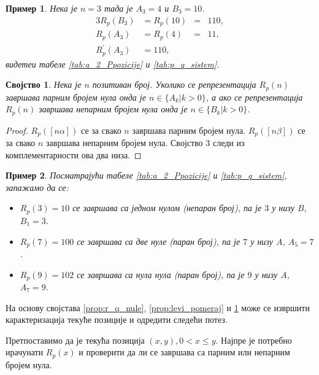 \documentclass[a4paper]{article}
\newtheorem{example}{Пример}
\newtheorem{property}{Својство}
\begin{document}
\begin{example}
	Нека је $ n = 3 $ тада је $ A_{3} = 4 $ и $ B_{3} = 10 $.	
	\begin{alignat*}{3}
		R_{p}(B_{3}) &= R_{p}(10)	&=& 110,\\
		R_{p}(A_{3}) &= R_{p}(4)	&=& 11,\\
		R_{p}^{'}(A_{3}) &= 110,
	\end{alignat*}
	видетеи табеле \ref{tab:a_2_Ppozicije} и \ref{tab:p_q_sistem}.
\end{example}

\begin{property}
	\label{prop:r_p_nule}
	Нека је $ n $ позитиван број. Уколико се репрезентација $ R_p(n) $ завршава парним бројем нула онда је $ n \in \{A_{k} | k>0\} $, а ако се репрезентација $ R_p(n) $ завршава непарним бројем нула онда је $ n \in \{B_{k} | k>0\} $.
\end{property}

\begin{proof}
	$ R_p([n\alpha]) $ се за свако $ n $ завршава парним бројем нула. $ R_p([n\beta]) $ се за свако $ n $ завршава непарним бројем нула. 
	Својство 3 следи из комплементарности ова два низа.
\end{proof}

\begin{example}
	Посматрајући табеле \ref{tab:a_2_Ppozicije} и \ref{tab:p_q_sistem}, запажамо да се:
	\begin{itemize}
		\item $ R_{p}(3) = 10 $ се завршава са једном нулом (непаран број), па је $ 3 $ у низу $ B $, $ B_{1} = 3 $. 
		\item $ R_{p}(7) = 100 $ се завршава са две нуле (паран број), па је $ 7 $ у низу $ A $, $ A_{5} = 7 $.
		\item $ R_{p}(9) = 102 $ се завршава са нула нула (паран број), па је $ 9 $ у низу $ A $, $ A_{7} = 9 $.
	\end{itemize}
\end{example}

На основу својстава \ref{prop:r_q_nule}, \ref{prop:levi_pomeraj} и \ref{prop:r_p_nule} може се извршити карактеризација текуће позиције и одредити следећи потез.

Претпоставимо да је текућа позиција $ (x, y), 0 < x \le y $. Најпре је потребно ирачунати $ R_{p}(x) $ и проверити да ли се завршава са парним или непарним бројем нула.
\end{document}
